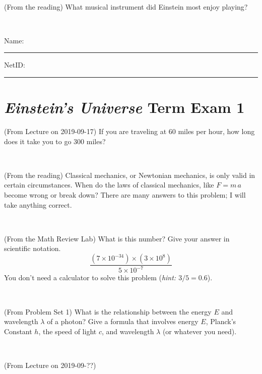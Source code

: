 \documentclass[12pt, letterpaper]{article}
\begin{document}
\vfill ~

\begin{problem} (From the reading)
What musical instrument did Einstein most enjoy playing?
\end{problem}


\vfill ~


\cleardoublepage



\noindent
Name: \rule[-1ex]{0.60\textwidth}{0.1pt}
NetID: \rule[-1ex]{0.20\textwidth}{0.1pt}

\section*{\textsl{Einstein's Universe} Term Exam 1}
\setcounter{problem}{1}


\begin{problem} (From Lecture on 2019-09-17)
If you are traveling at 60 miles per hour, how long does
it take you to go 300 miles?
\end{problem}


\vfill ~

\begin{problem} (From the reading)
Classical mechanics, or Newtonian mechanics, is only valid in certain
circumstances. When do the laws of classical mechanics, like $F =
m\,a$ become wrong or break down? There are many answers to this
problem; I will take anything correct.
\end{problem}


\vfill ~

\begin{problem} (From the Math Review Lab)
What is this number? Give your answer in scientific notation.
$$
\frac{(7\times10^{-34})\times(3\times10^8)}{5\times10^{-7}}
$$
You don't need a calculator to solve this problem (\textit{hint: $3/5=0.6$}).
\end{problem}


\vfill ~

\begin{problem} (From Problem Set 1)
What is the relationship between the energy $E$ and wavelength
$\lambda$ of a photon? Give a formula that involves energy $E$,
Planck's Constant $h$, the speed of light $c$, and wavelength
$\lambda$ (or whatever you need).
\end{problem}

\vfill ~


\clearpage


\begin{problem} (From Lecture on 2019-09-??)
\end{problem}
\end{document}
